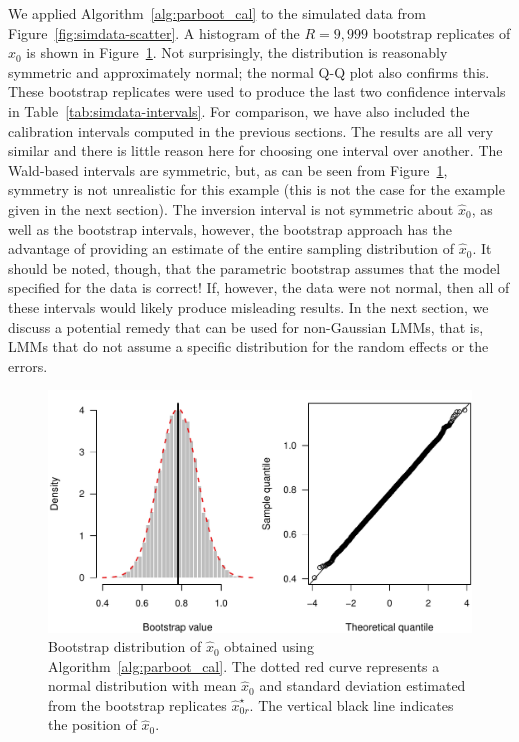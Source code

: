 \documentclass[cmfont,usenames,dvipsnames,leqno]{afit-etd}\usepackage[]{graphicx}\usepackage[]{color}
\makeatletter
\def\maxwidth{ %
  \ifdim\Gin@nat@width>\linewidth
    \linewidth
  \else
    \Gin@nat@width
  \fi
}
\newenvironment{knitrout}{}{} %
\renewenvironment{knitrout}{\begin{singlespace}}{\end{singlespace}}
\newcommand{\boot}{\star} %
\newcommand{\wh}[1]{\ensuremath{\widehat{#1}}}
\makeatother
\begin{document}
We applied Algorithm~\ref{alg:parboot_cal} to the simulated data from Figure~\ref{fig:simdata-scatter}. A histogram of the $R = 9,999$ bootstrap replicates of $\wh{x}_0$ is shown in Figure~\ref{fig:simdata-parboot-hist}. Not surprisingly, the distribution is reasonably symmetric and approximately normal; the normal Q-Q plot also confirms this. These bootstrap replicates were used to produce the last two confidence intervals in Table~\ref{tab:simdata-intervals}. For comparison, we have also included the calibration intervals computed in the previous sections. The results are all very similar and there is little reason here for choosing one interval over another. The Wald-based intervals are symmetric, but, as can be seen from Figure~\ref{fig:simdata-parboot-hist}, symmetry is not unrealistic for this example (this is not the case for the example given in the next section). The inversion interval is not symmetric about $\wh{x}_0$, as well as the bootstrap intervals, however, the bootstrap approach has the advantage of providing an estimate of the entire sampling distribution of $\wh{x}_0$. It should be noted, though, that the parametric bootstrap assumes that the model specified for the data is correct! If, however, the data were not normal, then all of these intervals would likely produce misleading results. In the next section, we discuss a potential remedy that can be used for non-Gaussian LMMs, that is, LMMs that do not assume a specific distribution for the random effects or the errors.

\begin{knitrout}
\color{fgcolor}\begin{figure}[!htb]

\includegraphics[width=\maxwidth]{figure/simdata-parboot-hist} \caption[Bootstrap distribution of $\wh{x}_0$ for the simulated random intercept data]{Bootstrap distribution of $\wh{x}_0$ obtained using Algorithm~\ref{alg:parboot_cal}. The dotted red curve represents a normal distribution  with mean $\wh{x}_0$ and standard deviation estimated from the bootstrap replicates $\wh{x}_{0r}^\boot$. The vertical black line indicates the position of $\wh{x}_0$.\label{fig:simdata-parboot-hist}}
\end{figure}


\end{knitrout}
\end{document}
